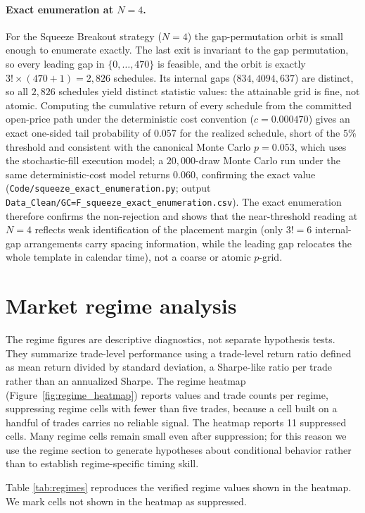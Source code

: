 \documentclass[preprint,12pt]{elsarticle}
\theoremstyle{definition}
\begin{document}
\paragraph{Exact enumeration at $N=4$.} For the Squeeze Breakout strategy ($N=4$) the
gap-permutation orbit is small enough to enumerate exactly. The last exit is invariant
to the gap permutation, so every leading gap in $\{0,\dots,470\}$ is feasible, and the
orbit is exactly $3!\times(470{+}1)=2{,}826$ schedules. Its internal gaps
($834,4094,637$) are distinct, so all $2{,}826$ schedules yield distinct statistic
values: the attainable grid is fine, not atomic. Computing the cumulative return of
every schedule from the committed open-price path under the deterministic cost
convention ($c=0.000470$) gives an exact one-sided tail probability of $0.057$ for the
realized schedule, short of the $5\%$ threshold and consistent with the canonical Monte Carlo
$p=0.053$, which uses the stochastic-fill execution model; a $20{,}000$-draw Monte Carlo run
under the same deterministic-cost model returns $0.060$, confirming the exact value (\texttt{Code/squeeze\_exact\_enumeration.py}; output
\texttt{Data\_Clean/GC=F\_squeeze\_exact\_enumeration.csv}). The exact enumeration
therefore confirms the non-rejection and shows that the near-threshold reading at $N=4$
reflects weak identification of the placement margin (only $3!=6$ internal-gap
arrangements carry spacing information, while the leading gap relocates the whole
template in calendar time), not a coarse or atomic $p$-grid.

\section{Market regime analysis}

The regime figures are descriptive diagnostics, not separate hypothesis tests. They summarize trade-level performance using a trade-level return ratio defined as mean return divided by standard deviation, a Sharpe-like ratio per trade rather than an annualized Sharpe. The regime heatmap (Figure~\ref{fig:regime_heatmap}) reports values and trade counts per regime, suppressing regime cells with fewer than five trades, because a cell built on a handful of trades carries no reliable signal. The heatmap reports 11 suppressed cells. Many regime cells remain small even after suppression; for this reason we use the regime section to generate hypotheses about conditional behavior rather than to establish regime-specific timing skill.

Table \ref{tab:regimes} reproduces the verified regime values shown in the heatmap. We mark cells not shown in the heatmap as suppressed.
\end{document}
